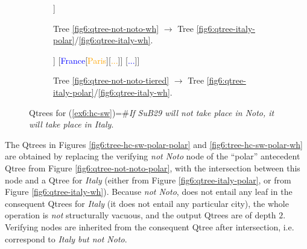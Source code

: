 \begin{figure}[H]
\ContinuedFloat
\centering
\begin{subfigure}[b]{.45\linewidth}
	\centering
	\scalebox{1}
	{\begin{forest}
			[CS [\textcolor{orange}{Noto}] [\fbox{\textcolor{orange}{Rome}}] [\fbox{\textcolor{orange}{...}}] [\textcolor{orange}{Paris}] [\textcolor{orange}{...}]]
	\end{forest}}
	\caption[]{Tree \ref{fig6:qtree-not-noto-wh} $\rightarrow$ Tree \ref{fig6:qtree-italy-polar}/\ref{fig6:qtree-italy-wh}.}\label{fig6:tree-hc-sw-wh}
\end{subfigure}\hfill
\begin{subfigure}[b]{.45\linewidth}
	\centering
	\scalebox{1}
	{\begin{forest}
			[CS [\textcolor{blue}{Italy}[\textcolor{orange}{Noto}] [\fbox{\textcolor{orange}{Rome}}] [\fbox{\textcolor{orange}{...}}]]  [\textcolor{blue}{France}[\textcolor{orange}{Paris}][\textcolor{orange}{...}]] [\textcolor{blue}{...}]]
	\end{forest}}
	\caption[]{Tree \ref{fig6:qtree-not-noto-tiered} $\rightarrow$ Tree \ref{fig6:qtree-italy-polar}/\ref{fig6:qtree-italy-wh}.}\label{fig6:tree-hc-sw-wh-wh}
\end{subfigure}
\caption[]{Qtrees for (\ref{ex6:hc-sw})=\#\textit{If SuB29 will not take place in Noto, it will take place in Italy}.}
\label{fig6:qtrees-hc-sw}
\end{figure}

The Qtrees in Figures \ref{fig6:tree-hc-sw-polar-polar} and \ref{fig6:tree-hc-sw-polar-wh} are obtained by replacing the verifying \textit{not Noto} node of the ``polar'' antecedent Qtree from Figure \ref{fig6:qtree-not-noto-polar}, with the intersection between this node and a Qtree for \textit{Italy} (either from Figure \ref{fig6:qtree-italy-polar}, or from Figure \ref{fig6:qtree-italy-wh}). Because \textit{not Noto}, does not entail any leaf in the consequent Qtrees for \textit{Italy} (it does not entail any particular city), the whole operation is \textit{not} structurally vacuous, and the output Qtrees are of depth $2$. Verifying nodes are inherited from the consequent Qtree after intersection, i.e. correspond to \textit{Italy but not Noto}.

